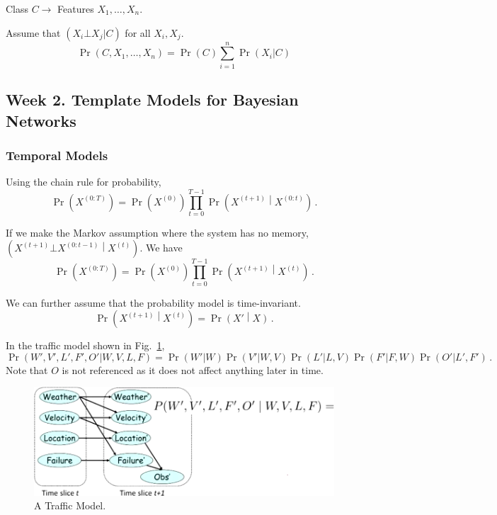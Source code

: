 \documentclass[12pt]{article}
\begin{document}
Class $C \rightarrow$ Features $X_1, \ldots, X_n$.

Assume that $(X_i \bot X_j | C)$ for all $X_i, X_j$.
\begin{equation*}
  \Pr(C, X_1, \ldots, X_n) = \Pr(C) \sum_{i=1}^n \Pr(X_i | C)
\end{equation*}



\subsection{Week 2. Template Models for Bayesian Networks}

\subsubsection{Temporal Models}

Using the chain rule for probability,
\begin{equation*}
  \Pr(X^{(0:T)}) = \Pr(X^{(0)}) \prod_{t=0}^{T-1} \Pr\left(X^{(t+1)} \middle\vert X^{(0:t)} \right) \, .
\end{equation*}

If we make the Markov assumption where the system has no memory, $\left( X^{(t+1)} \bot X^{(0:t-1)} \middle\vert X^{(t)}\right)$.
We have
\begin{equation*}
  \Pr(X^{(0:T)}) = \Pr(X^{(0)}) \prod_{t=0}^{T-1} \Pr\left(X^{(t+1)} \middle\vert X^{(t)} \right) \, .
\end{equation*}

We can further assume that the probability model is time-invariant.
\begin{equation*}
  \Pr\left(X^{(t+1)} \middle\vert X^{(t)} \right) = \Pr\left(X' \middle\vert X \right) \, .
\end{equation*}

In the traffic model shown in Fig.~\ref{fig:example_template_transit_model},
\begin{equation*}
  \Pr(W', V', L', F', O' | W, V, L, F) = \Pr(W'|W) \Pr(V'|W, V) \Pr(L' | L, V) \Pr(F' | F, W) \Pr(O' | L', F') \, .
\end{equation*}
Note that $O$ is not referenced as it does not affect anything later in time.

\begin{figure}[H]
\centering
\includegraphics[width=6.5in]{graphics/example_template_transit_model.png}
\caption{A Traffic Model.}
\label{fig:example_template_transit_model}
\end{figure}
\end{document}
